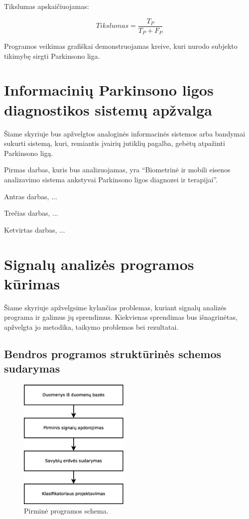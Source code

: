\documentclass[]{vgtuef}
\begin{document}
Tikslumas apskaičiuojamas:

\begin{equation}
Tikslumas = \frac{T_P}{T_P + F_P}
\end{equation}

Programos veikimas grafiškai demonstruojamas kreive, kuri nurodo
subjekto tikimybę sirgti Parkinsono liga.

\section{Informacinių Parkinsono ligos diagnostikos sistemų apžvalga}

Šiame skyriuje bus apžvelgtos analoginės informacinės sistemos arba
bandymai sukurti sistemą, kuri, remiantis įvairių jutiklių pagalba,
gebėtų atpažinti Parkinsono ligą.

Pirmas darbas, kuris bus analizuojamas, yra ``Biometrinė ir mobili
eisenos analizavimo sistema ankstyvai Parkinsono ligos diagnozei ir %
terapijai''. 

Antras darbas, ...

Trečias darbas, ...

Ketvirtas darbas, ...

\section{Signalų analizės programos kūrimas}

Šiame skyriuje apžvelgsime kylančias problemas, kuriant signalų
analizės programa ir galimus jų sprendimus. Kiekvienas sprendimas bus
išnagrinėtas, apžvelgta jo metodika, taikymo problemos bei rezultatai.


\subsection{Bendros programos struktūrinės schemos sudarymas}

\begin{figure}[!t]
  \centering
  \includegraphics[width=200px]{figures/pirmine_schema.eps}
  \caption{Pirminė programos schema.}
  \label{fig:pirmine_programos_schema}
\end{figure}
\end{document}
